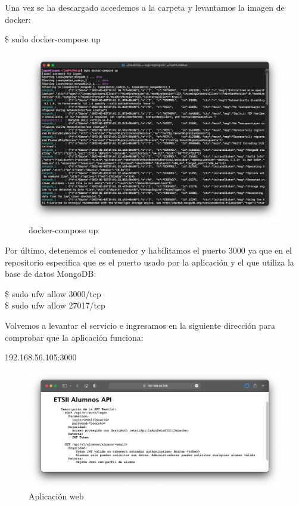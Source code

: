 Una vez se ha descargado accedemos a la carpeta y levantamos la imagen de docker:
\begin{tcolorbox}[colback=black!10, halign=left]
    \$ sudo docker-compose up
\end{tcolorbox}
\begin{figure}[H]
    \centering
    \includegraphics[scale=0.4]{images/docker_compose.png}
    \caption{docker-compose up}
    \label{fig:docker_compose}
\end{figure}

Por último, detenemos el contenedor y habilitamos el puerto 3000 ya que en el repositorio especifica que es el puerto usado por la aplicación y el que utiliza la base
de datos MongoDB:
\begin{tcolorbox}[colback=black!10, halign=left]
    \$ sudo ufw allow 3000/tcp \\
    \$ sudo ufw allow 27017/tcp
\end{tcolorbox}

Volvemos a levantar el servicio e ingresamos en la siguiente dirección para comprobar que la aplicación funciona:
\begin{tcolorbox}[colback=black!10, halign=left]
    192.168.56.105:3000
\end{tcolorbox}
\begin{figure}[H]
    \centering
    \includegraphics[scale=0.33]{images/iseP4JMeter.png}
    \caption{Aplicación web}
    \label{fig:iseP4JMeter}
\end{figure}


